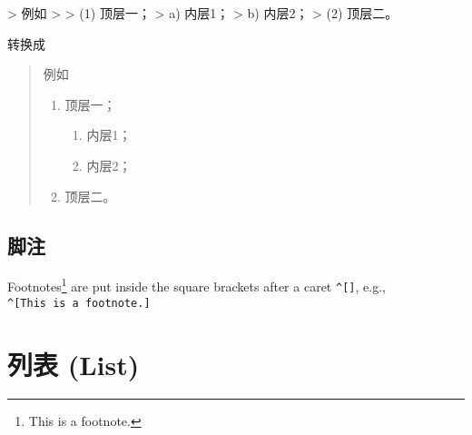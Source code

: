 \documentclass[]{ctexbook}
\newenvironment{Shaded}{\begin{snugshade}}{\end{snugshade}}
\newcommand{\AttributeTok}[1]{\textcolor[rgb]{0.77,0.63,0.00}{#1}}
\providecommand{\tightlist}{%
  \setlength{\itemsep}{0pt}\setlength{\parskip}{0pt}}
\begin{document}
\begin{itemize}
\begin{Shaded}
\begin{Highlighting}[]
\AttributeTok{\textgreater{} 例如}
\AttributeTok{\textgreater{}}  
\AttributeTok{\textgreater{} (1) 顶层一；}
\AttributeTok{\textgreater{}     a) 内层1；}
\AttributeTok{\textgreater{}     b) 内层2；}
\AttributeTok{\textgreater{} (2) 顶层二。}
\end{Highlighting}
\end{Shaded}

  转换成

  \begin{quote}
  例如

  \begin{enumerate}
  \def\labelenumi{(\arabic{enumi})}
  \tightlist
  \item
    顶层一；

    \begin{enumerate}
    \def\labelenumii{\alph{enumii})}
    \tightlist
    \item
      内层1；
    \item
      内层2；
    \end{enumerate}
  \item
    顶层二。
  \end{enumerate}
  \end{quote}
\end{itemize}

\hypertarget{ux811aux6ce8}{%
\subsection{脚注}\label{ux811aux6ce8}}

Footnotes\footnote{This is a footnote.} are put inside the square brackets after a caret \texttt{\^{}{[}{]}}, e.g., \texttt{\^{}{[}This\ is\ a\ footnote.{]}}

\hypertarget{ux5217ux8868-list}{%
\section{列表 (List)}\label{ux5217ux8868-list}}
\end{document}
